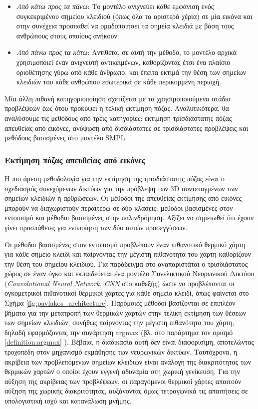 \begin{itemize}
    \item \textsl{Από κάτω προς τα πάνω}: Το μοντέλο ανιχνεύει κάθε εμφάνιση ενός συγκεκριμένου σημείου κλειδιού (όπως όλα τα αριστερά χέρια) σε μία εικόνα και στην συνέχεια προσπαθεί να ομαδοποιήσει τα σημεία κλειδιά με βάση τους ανθρώπους στους οποίους ανήκουν. 
    \item \textsl{Από πάνω προς τα κάτω}: Αντίθετα, σε αυτή την μέθοδο, το μοντέλο αρχικά χρησιμοποιεί έναν ανιχνευτή αντικειμένων, καθορίζοντας έτσι ένα πλαίσιο οριοθέτησης γύρω από κάθε άνθρωπο, και έπειτα εκτιμά την θέση των σημείων κλειδιών του κάθε ανθρώπου εσωτερικά σε κάθε περικομμένη περιοχή.
\end{itemize}

Μία άλλη πιθανή κατηγοριοποίηση σχετίζεται με τα χρησιμοποιούμενα στάδια προβλέψεων έως ότου προκύψει η τελική εκτίμηση πόζας. Αναλυτικότερα, θα αναλύσουμε τις μεθόδους από τρεις κατηγορίες: εκτίμηση τρισδιάστατης πόζας απευθείας από εικόνες, ανύψωση από δισδιάστατες σε τρισδιάστατες προβλέψεις και μεθόδους βασισμένες στο μοντέλο SMPL. 

\subsubsection{Εκτίμηση πόζας απευθείας από εικόνες}

Η πιο άμεση μεθοδολογία για την εκτίμηση της τρισδιάστατης πόζας είναι ο σχεδιασμός συνεχόμενων δικτύων για την πρόβλεψη των 3D συντεταγμένων των σημείων κλειδιών ή αρθρώσεων. Οι μέθοδοι της απευθείας εκτίμησης από εικόνες μπορούν να διαχωριστούν περαιτέρω σε δύο κλάσεις: μέθοδοι βασισμένες στον εντοπισμό και μέθοδοι βασισμένες στην παλινδρόμηση. Αξίζει να σημειωθεί ότι έχουν γίνει προσπάθειες για ενοποίηση των δύο αυτών προσεγγίσεων.

Οι μέθοδοι βασισμένες στον εντοπισμό προβλέπουν έναν πιθανοτικό θερμικό χάρτη για κάθε σημείο κλειδί και παίρνοντας την μέγιστη πιθανότητα του χάρτη καθορίζουν την θέση του σημείου κλειδιού. Για παράδειγμα στο \cite{pavlakos_paper} αναπαριστάται ο τρισδιάστατος χώρος σε έναν όγκο και εκπαιδεύεται ένα μοντέλο Συνελικτικού Νευρωνικού Δικτύου (\textsl{Convolutional Neural Network, CNN} στο καθεξής) ώστε να προβλέπονται οι ογκομετρικοί πιθανοτικοί θερμικοί χάρτες για κάθε σημείο κλειδί, όπως φαίνεται στο Σχήμα \ref{fig:pavlakos_architecture}. Παρόμοιες μέθοδοι βασίζονται σε επιπλέον βήματα για την μετατροπή των θερμικών χαρτών στην τελική εκτίμηση των θέσεων των σημείων κλειδιών, συνήθως παίρνοντας την μέγιστη πιθανότητα του χάρτη, δηλαδή εφαρμόζοντας την συνάρτηση argmax (βλ. στο παράρτημα τον ορισμό \ref{definition:argmax} ). Βέβαια, η διαδικασία αυτή δεν είναι διαφορίσιμη, αποτελώντας τροχοπέδη στον μηχανισμό εκμάθησης των νευρωνικών δικτύων. Ταυτόχρονα, η ακρίβεια των προβλεπόμενων σημείων κλειδιών είναι ανάλογη της διακριτότητας των θερμικών χαρτών ο οποίοι έχουν εγγενή αδυναμία στη χωρική γενίκευση. Για την αύξηση της ακρίβειας των προβλέψεων, οι παραγόμενοι θερμικοί χάρτες απαιτούν αύξηση της χωρικής διακριτότητας, αυξάνοντας όμως τετραγωνικά τις απαιτήσεις σε υπολογιστική ισχύ και κατανάλωση μνήμης.


